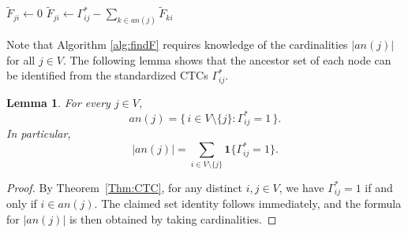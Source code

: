 \documentclass[10pt]{article}
\newtheorem{lemma}[theorem]{Lemma}
\begin{document}
 
 \begin{algorithm}[h]
 \caption{Find $\widetilde{F}$ from $\boldsymbol{\Gamma}^*$}
\label{alg:findF}
 \begin{algorithmic}[1]
             \State $\widetilde{F}_{ji} \gets 0$
         \EndFor
             \State $\widetilde{F}_{ji} \gets \Gamma^*_{ij} - \sum_{k \in {an}(j)} \widetilde{F}_{ki}$
         \EndFor
     \EndFor
 \EndFor
 \end{algorithmic}
 \end{algorithm}

 
Note that  Algorithm \ref{alg:findF} requires knowledge of the cardinalities $|an(j)|$ for all $j \in V$. The following lemma shows that the ancestor set of each node can be identified from the standardized CTCs $\Gamma^*_{ij}$. 


\begin{lemma}\label{lem:ancestor_set_gamma}
For every $j \in V$,
\begin{equation}
an(j)= \{\, i \in V \setminus \{j\} : \Gamma^*_{ij}=1 \,\}.
\end{equation}
In particular,
\begin{equation}
|an(j)| = \sum_{i \in V \setminus \{j\}} \mathbf{1}\{\Gamma^*_{ij}=1\}.
\end{equation}
\end{lemma}

\begin{proof}
By Theorem~\ref{Thm:CTC}, for any distinct $i,j \in V$, we have $\Gamma^*_{ij}=1$ if and only if $i \in an(j)$. The claimed set identity follows immediately, and the formula for $|an(j)|$ is then obtained by taking cardinalities.
\end{proof}
\end{document}
